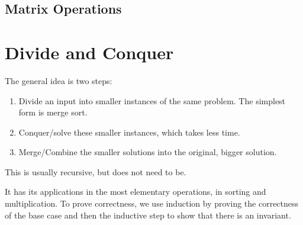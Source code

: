 \documentclass{article}
\begin{document}
  \subsection{Matrix Operations}

    \begin{definition}
      
    \end{definition}

    \begin{definition}
      
    \end{definition}

    \begin{definition}[QR Decomposition]
      
    \end{definition}

    \begin{definition}[LU Decomposition]
      
    \end{definition}

    \begin{definition}
      
    \end{definition}

\section{Divide and Conquer} 

    \begin{definition}
      The general idea is two steps: 
      \begin{enumerate}
        \item Divide an input into smaller instances of the same problem. The simplest form is merge sort. 
        \item Conquer/solve these smaller instances, which takes less time. 
        \item Merge/Combine the smaller solutions into the original, bigger solution. 
      \end{enumerate}
      This is usually recursive, but does not need to be. 
    \end{definition}

    It has its applications in the most elementary operations, in sorting and multiplication. To prove correctness, we use induction by proving the correctness of the base case and then the inductive step to show that there is an invariant. 
  
\end{document}
